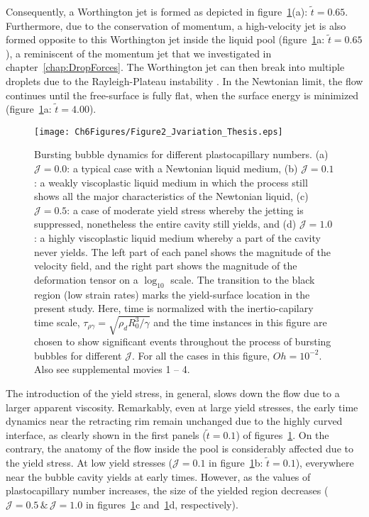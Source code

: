 Consequently, a Worthington jet is formed as depicted in figure~\ref{Ch7::fig:J_Variation}(a): $\tilde t = 0.65$. Furthermore, due to the conservation of momentum, a high-velocity jet is also formed opposite to this Worthington jet inside the liquid pool (figure~\ref{Ch7::fig:J_Variation}a: $\tilde t = 0.65$), a reminiscent of the momentum jet that we investigated in chapter~\ref{chap:DropForces}. The Worthington jet can then break into multiple droplets due to the Rayleigh-Plateau instability \citep{walls2015jet}. In the Newtonian limit, the flow continues until the free-surface is fully flat, when the surface energy is minimized (figure~\ref{Ch7::fig:J_Variation}a: $\tilde t = 4.00$).

\begin{figure}
	\centering
	\texttt{[image: Ch6Figures/Figure2\_Jvariation\_Thesis.eps]}
	\caption{Bursting bubble dynamics for different plastocapillary numbers. (a) $\mathcal{J} = 0.0$: a typical case with a Newtonian liquid medium, (b) $\mathcal{J} =0.1$: a weakly viscoplastic liquid medium in which the process still shows all the major characteristics of the Newtonian liquid, (c) $\mathcal{J} = 0.5$: a case of moderate yield stress whereby the jetting is suppressed, nonetheless the entire cavity still yields, and (d) $\mathcal{J} = 1.0$: a highly viscoplastic liquid medium whereby a part of the cavity never yields. The left part of each panel shows the magnitude of the velocity field, and the right part shows the magnitude of the deformation tensor on a $\log_{10}$ scale. The transition to the black region (low strain rates) marks the yield-surface location in the present study. Here, time is normalized with the inertio-capilary time scale, $\tau_{\rho\gamma} = \sqrt{\rho_d R_0^3/\gamma}$ and the time instances in this figure are chosen to show significant events throughout the process of bursting bubbles for different $\mathcal{J}$. For all the cases in this figure, $Oh = 10^{-2}$. Also see supplemental movies {\color{Myfig} 1 -- 4}.}
	\label{Ch7::fig:J_Variation}
\end{figure}

The introduction of the yield stress, in general, slows down the flow due to a larger apparent viscosity. Remarkably, even at large yield stresses, the early time dynamics near the retracting rim remain unchanged due to the highly curved interface, as clearly shown in the first panels ($\tilde t = 0.1$) of figures~\ref{Ch7::fig:J_Variation}.  
On the contrary, the anatomy of the flow inside the pool is considerably affected due to the yield stress. At low yield stresses ($\mathcal{J} = 0.1$ in figure~\ref{Ch7::fig:J_Variation}b: $\tilde t = 0.1$), everywhere near the bubble cavity yields at early times. However, as the values of plastocapillary number increases, the size of the yielded region decreases ($\mathcal{J} = 0.5\, \&\,\mathcal{J} = 1.0$ in figures~\ref{Ch7::fig:J_Variation}c and~\ref{Ch7::fig:J_Variation}d, respectively). 

